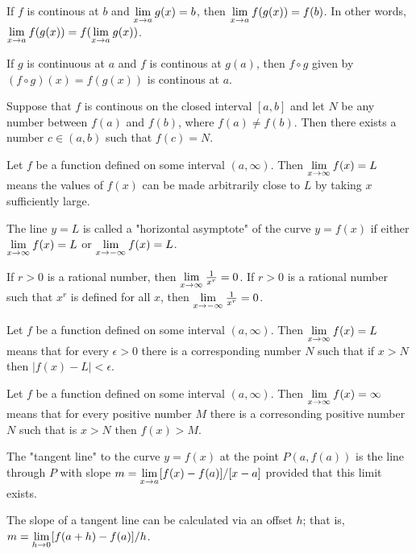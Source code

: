 \documentclass[a4paper,11pt]{article}
\begin{document}
\begin{outline}
    If \(f\) is continous at \(b\) and \(\lim\limits_{x\rightarrow a^{}} g(x) = b\), then \(\lim\limits_{x\rightarrow a^{}} f(g(x)) = f(b)\).
    In other words, \(\lim\limits_{x\rightarrow a^{}} f(g(x)) = f(\lim\limits_{x\rightarrow a^{}} g(x))\).

    If \(g\) is continuous at \(a\) and \(f\) is continous at \(g(a)\), then \(f \circ g\) given by
    \((f \circ g)(x) = f(g(x))\) is continous at \(a\).
    
    Suppose that \(f\) is continous on the closed interval \([a, b]\) and let \(N\) be any number between
    \(f(a)\) and \(f(b)\), where \(f(a) \neq f(b)\). Then there exists a number \(c \in (a, b)\) such that
    \(f(c) = N\).
    
    Let \(f\) be a function defined on some interval \((a, \infty)\). Then \(\lim\limits_{x\rightarrow \infty^{}} f(x) = L\)
    means the values of \(f(x)\) can be made arbitrarily close to \(L\) by taking \(x\) sufficiently large.
    
    The line \(y = L\) is called a "horizontal asymptote" of the curve \(y = f(x)\) if either \(\lim\limits_{x\rightarrow \infty^{}}
    f(x)=L\) or \(\lim\limits_{x\rightarrow -\infty^{}} f(x) = L\).
    
    If \(r > 0\) is a rational number, then \(\lim\limits_{x\rightarrow \infty^{}} \frac{1}{x^r} = 0\). If \(r > 0\) is
    a rational number such that \(x^r\) is defined for all \(x\), then \(\lim\limits_{x\rightarrow -\infty^{}} \frac{1}{x^r} = 0\).
    
    Let \(f\) be a function defined on some interval \((a, \infty)\). Then \(\lim\limits_{x\rightarrow \infty^{}} f(x) = L\) means
    that for every \(\epsilon > 0\) there is a corresponding number \(N\) such that if \(x > N\) then \(|f(x)-L| 
    < \epsilon\).
    
    Let \(f\) be a function defined on some interval \((a, \infty)\). Then \(\lim\limits_{x\rightarrow \infty^{}}f(x)=\infty\) means
    that for every positive number \(M\) there is a corresonding positive number \(N\) such that is \(x > N\) then
    \(f(x) > M\).
    
    The "tangent line" to the curve \(y = f(x)\) at the point \(P(a, f(a))\) is the line through \(P\) with slope
    \(m = \lim\limits_{x\rightarrow a^{}} [f(x)-f(a)]/[x-a]\) provided that this limit exists.
    
    The slope of a tangent line can be calculated via an offset \(h\); that is, \(m = \lim\limits_{h\rightarrow 0^{}}
    [f(a+h)-f(a)]/h\).
    

\end{outline}
\end{document}
